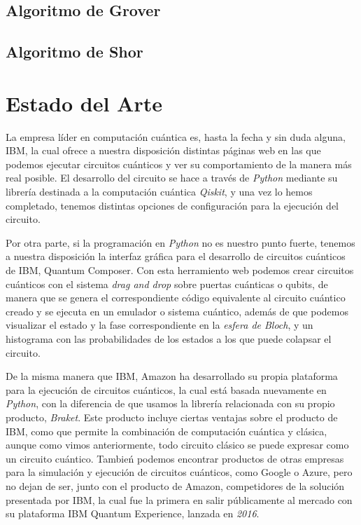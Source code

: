 \documentclass{article}
\numberwithin{equation}{section} %
\begin{document}
    \subsection{Algoritmo de Grover}
    \subsection{Algoritmo de Shor}





    \newpage
    \thispagestyle{empty}
    \mbox{}

    \section{Estado del Arte}

    \vspace{5mm}

    La empresa líder en computación cuántica es, hasta la fecha y sin duda alguna, IBM, la cual ofrece a nuestra disposición distintas páginas web en las que podemos ejecutar circuitos cuánticos y ver su comportamiento de la manera más real posible. El desarrollo del circuito se hace a través de \textit{Python} mediante su librería destinada a la computación cuántica \textit{Qiskit}, y una vez lo hemos completado, tenemos distintas opciones de configuración para la ejecución del circuito.

    \vspace{5mm}

    Por otra parte, si la programación en \textit{Python} no es nuestro punto fuerte, tenemos a nuestra disposición la interfaz gráfica para el desarrollo de circuitos cuánticos de IBM, Quantum Composer. Con esta herramiento web podemos crear circuitos cuánticos con el sistema \textit{drag and drop} sobre puertas cuánticas o qubits, de manera que se genera el correspondiente código equivalente al circuito cuántico creado y se ejecuta en un emulador o sistema cuántico, además de que podemos visualizar el estado y la fase correspondiente en la \textit{esfera de Bloch}, y un histograma con las probabilidades de los estados a los que puede colapsar el circuito.
    
    \vspace{5mm}

    De la misma manera que IBM, Amazon ha desarrollado su propia plataforma para la ejecución de circuitos cuánticos, la cual está basada nuevamente en \textit{Python}, con la diferencia de que usamos la librería relacionada con su propio producto, \textit{Braket}. Este producto incluye ciertas ventajas sobre el producto de IBM, como que permite la combinación de computación cuántica y clásica, aunque como vimos anteriormente, todo circuito clásico se puede expresar como un circuito cuántico. Tambień podemos encontrar productos de otras empresas para la simulación y ejecución de circuitos cuánticos, como Google o Azure, pero no dejan de ser, junto con el producto de Amazon, competidores de la solución presentada por IBM, la cual fue la primera en salir públicamente al mercado con su plataforma IBM Quantum Experience, lanzada en \textit{2016}.
\end{document}
